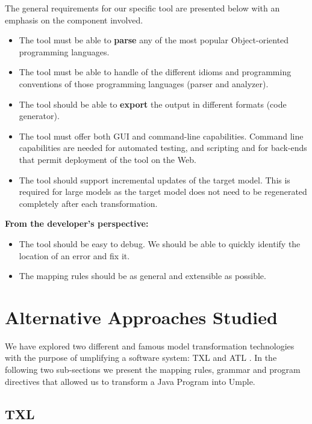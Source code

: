 The general requirements for our specific tool are presented below with an emphasis on the component involved.

\begin{itemize}
\item The tool must be able to \textbf{parse} any of the most popular Object-oriented programming languages.
\item The tool must be able to handle of  the different idioms and programming conventions of those programming languages (parser and analyzer).
\item The tool should be able to \textbf{export} the output in different formats (code generator).
\item The tool must offer both GUI and command-line capabilities. Command line capabilities are needed for automated testing, and scripting and for back-ends that permit deployment of the tool on the Web.
\item The tool should support incremental updates of the target model. This is required for large models as the target model does not need to be regenerated completely after each transformation. 
\end{itemize}


\textbf{From the developer's perspective:}
\begin{itemize}
\item The tool should be easy to debug. We should be able to quickly identify the location of an error and fix it.
\item The mapping rules should be as general and extensible as possible. 
\end{itemize}


\section{Alternative Approaches Studied}
We have explored two different and famous model transformation technologies with the purpose of umplifying a software system: TXL \cite{Cordy2006} and ATL \cite{atl}. In the following two sub-sections we present the mapping rules, grammar and program directives that allowed us to transform a Java Program into Umple. 

\subsection{TXL}


